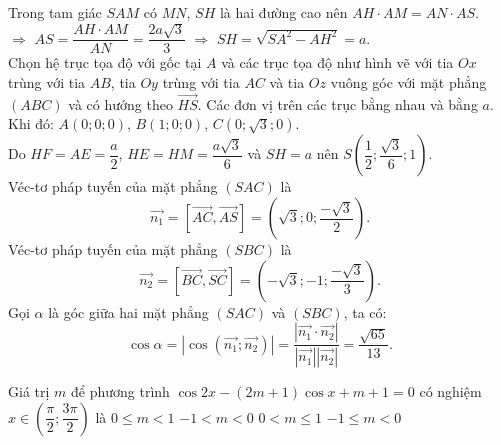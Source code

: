 \begin{ex}
{{\begin{tikzpicture}[>=stealth,scale=1,x=1cm,y=1cm]
	\end{tikzpicture}
}
Trong tam giác $SAM$ có $MN$, $SH$ là hai đường cao nên $AH\cdot AM=AN\cdot AS$.\\
$\Rightarrow$ $AS=\dfrac{AH\cdot AM}{AN}=\dfrac{2a\sqrt{3}}{3}$
$\Rightarrow$ $SH=\sqrt{SA^2-AH^2}=a$.\\
Chọn hệ trục tọa độ với gốc tại $A$ và các trục tọa độ như hình vẽ với tia $Ox$ trùng với tia $AB$, tia $Oy$ trùng với tia $AC$ và tia $Oz$ vuông góc với mặt phẳng $(ABC)$ và có hướng theo $\vec{HS}$. Các đơn vị trên các trục bằng nhau và bằng $a$.\\
Khi đó: $A(0;0;0)$, $B(1;0;0)$, $C(0;\sqrt{3};0)$.\\
Do $HF=AE=\dfrac{a}{2}$, $HE=HM=\dfrac{a\sqrt{3}}{6}$ và $SH=a$ nên $S\left(\dfrac{1}{2};\dfrac{\sqrt{3}}{6};1\right)$.\\
Véc-tơ pháp tuyến của mặt phẳng $(SAC)$ là $$\vec{n_1}=[\vec{AC},\vec{AS}]=\left(\sqrt{3};0;\dfrac{-\sqrt{3}}{2}\right).$$
Véc-tơ pháp tuyến của mặt phẳng $(SBC)$ là $$\vec{n_2}=[\vec{BC},\vec{SC}]=\left(-\sqrt{3};-1;\dfrac{-\sqrt{3}}{3}\right).$$
Gọi $\alpha$ là góc giữa hai mặt phẳng $(SAC)$ và $(SBC)$, ta có: $$\cos \alpha=|\cos (\vec{n_1};\vec{n_2})|=\dfrac{|\vec{n_1}\cdot\vec{n_2}|}{|\vec{n_1}||\vec{n_2}|}=\dfrac{\sqrt{65}}{13}.$$
}
\end{ex}

\begin{ex}%
Giá trị $m$ để phương trình $\cos 2x - (2m+1)\cos x +m+1=0$ có nghiệm $x\in\left(\dfrac{\pi}{2};\dfrac{3\pi}{2}\right)$ là
\choice
{$0\le m<1$}
{$-1<m<0$}
{$0<m\le 1$}
{\True $-1\le m<0$}
\end{ex}

